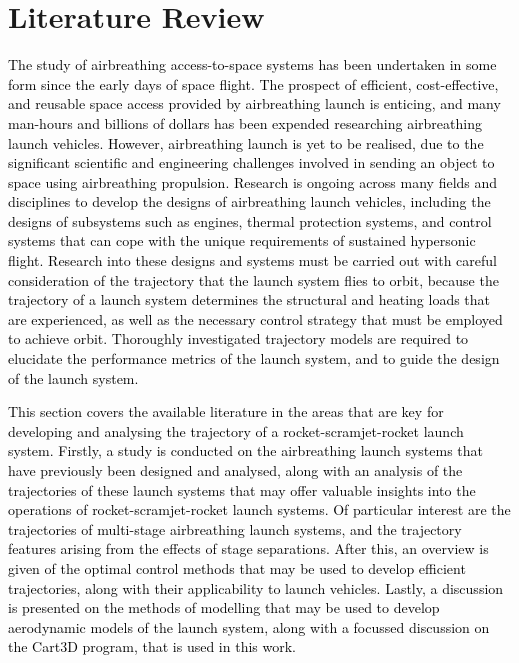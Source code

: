 
\cleardoublepage
\chapter{Literature Review}\label{chapter:literature-review}

	
  \textcolor{black}{
  The study of airbreathing access-to-space systems has been undertaken in some form since the early days of space flight. The prospect of efficient, cost-effective, and reusable space access provided by airbreathing launch is enticing, and many man-hours and billions of dollars has been expended researching airbreathing launch vehicles. However, airbreathing launch is yet to be realised, due to the significant scientific and engineering challenges involved in sending an object to space using airbreathing propulsion. Research is ongoing across many fields and disciplines to develop the designs of airbreathing launch vehicles, including the designs of subsystems such as engines, thermal protection systems, and control systems that can cope with the unique requirements of sustained hypersonic flight. }
\textcolor{black}{Research into these designs and systems must be carried out with careful consideration of the trajectory that the launch system flies to orbit, because the trajectory of a launch system determines the structural and heating loads that are experienced, as well as the necessary control strategy that must be employed to achieve orbit. Thoroughly investigated trajectory models are required to elucidate the performance metrics of the launch system, and to guide the design of the launch system.
}



\textcolor{black}{
This section covers the available literature in the areas that are key for developing and analysing the trajectory of a rocket-scramjet-rocket launch system. 
Firstly, a study is conducted on the airbreathing launch systems that have previously been designed and analysed, along with an analysis of the trajectories of these launch systems that may offer valuable insights into the operations of rocket-scramjet-rocket launch systems. Of particular interest are the trajectories of multi-stage airbreathing launch systems, and the trajectory features arising from the effects of stage separations. 
After this, an overview is given of the optimal control methods that may be used to develop efficient trajectories, along with their applicability to launch vehicles. 
Lastly, a discussion is presented on the methods of modelling that may be used to develop aerodynamic models of the launch system, along with a focussed discussion on the Cart3D program, that is used in this work. 
}

